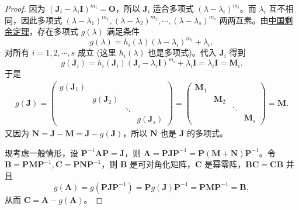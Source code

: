 \documentclass[../../main.tex]{subfiles}
\begin{document}
\begin{proof}
因为 $(\boldsymbol{J}_i - \lambda_i\boldsymbol{I})^{m_i} = \boldsymbol{O}$，所以 $\boldsymbol{J}_i$ 适合多项式 $(\lambda - \lambda_i)^{m_i}$。而 $\lambda_i$ 互不相同，因此多项式 $(\lambda - \lambda_1)^{m_1}, (\lambda - \lambda_2)^{m_2}, \cdots, (\lambda - \lambda_s)^{m_s}$ 两两互素。由\hyperref[theorem:中国剩余定理]{中国剩余定理}，存在多项式 $g(\lambda)$ 满足条件
\[
g(\lambda) = h_i(\lambda)(\lambda - \lambda_i)^{m_i} + \lambda_i,
\]
对所有 $i = 1, 2, \cdots, s$ 成立 (这里 $h_i(\lambda)$ 也是多项式)。代入 $\boldsymbol{J}_i$ 得到
\[
g(\boldsymbol{J}_i) = h_i(\boldsymbol{J}_i)(\boldsymbol{J}_i - \lambda_i\boldsymbol{I})^{m_i} + \lambda_i\boldsymbol{I} = \lambda_i\boldsymbol{I} = \boldsymbol{M}_i.
\]
于是
\begin{align*}
g(\boldsymbol{J}) = 
\begin{pmatrix}
g(\boldsymbol{J}_1) & & & \\
 & g(\boldsymbol{J}_2) & & \\
 & & \ddots & \\
 & & & g(\boldsymbol{J}_s)
\end{pmatrix}
=
\begin{pmatrix}
\boldsymbol{M}_1 & & & \\
 & \boldsymbol{M}_2 & & \\
 & & \ddots & \\
 & & & \boldsymbol{M}_s
\end{pmatrix}
= \boldsymbol{M}.
\end{align*}
又因为 $\boldsymbol{N} = \boldsymbol{J} - \boldsymbol{M} = \boldsymbol{J} - g(\boldsymbol{J})$，所以 $\boldsymbol{N}$ 也是 $\boldsymbol{J}$ 的多项式。

现考虑一般情形，设 $\boldsymbol{P}^{-1}\boldsymbol{AP} = \boldsymbol{J}$，则 $\boldsymbol{A} = \boldsymbol{PJP}^{-1} = \boldsymbol{P}(\boldsymbol{M} + \boldsymbol{N})\boldsymbol{P}^{-1}$。令 $\boldsymbol{B} = \boldsymbol{PMP}^{-1}, \boldsymbol{C} = \boldsymbol{PNP}^{-1}$，则 $\boldsymbol{B}$ 是可对角化矩阵，$\boldsymbol{C}$ 是幂零阵，$\boldsymbol{BC} = \boldsymbol{CB}$ 并且
\[
g(\boldsymbol{A}) = g(\boldsymbol{PJP}^{-1}) = \boldsymbol{P}g(\boldsymbol{J})\boldsymbol{P}^{-1} = \boldsymbol{PMP}^{-1} = \boldsymbol{B},
\]
从而 $\boldsymbol{C} = \boldsymbol{A} - g(\boldsymbol{A})$。


\end{proof}
\end{document}
